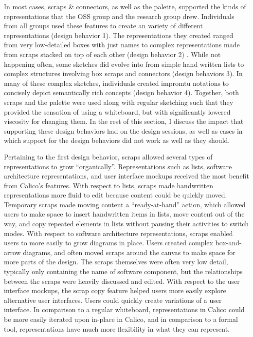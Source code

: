 In most cases, scraps \& connectors, as well as the palette, supported the kinds of representations that the OSS group and the research group drew. Individuals from all groups used these features to create an variety of different representations (design behavior 1). The representations they created ranged from very low-detailed boxes with just names to complex representations made from scraps stacked on top of each other (design behavior 2) . While not happening often, some sketches did evolve into from simple hand written lists to complex structures involving box scraps and connectors (design behaviors 3). In many of these complex sketches, individuals created impromtu notations to concisely depict semantically rich concepts (design behavior 4). Together, both scraps and the palette were used along with regular sketching such that they provided the sensation of using a whiteboard, but with significantly lowered viscosity for changing them. In the rest of this section, I discuss the impact that supporting these design behaviors had on the design sessions, as well as cases in which support for the design behaviors did not work as well as they should. 

Pertaining to the first design behavior, scraps allowed several types of representations to grow ``organically''. Representations such as lists, software architecture representations, and user interface mockups received the most benefit from Calico's features. With respect to lists, scraps made handwritten representations more fluid to edit because content could be quickly moved. Temporary scraps made moving content a ``ready-at-hand'' action, which allowed users to make space to insert handwritten items in lists, move content out of the way, and copy repeated elements in lists without pausing their activities to switch modes. With respect to software architecture representations, scraps enabled users to more easily to grow diagrams in place. Users created complex box-and-arrow diagrams, and often moved scraps around the canvas to make space for more parts of the design. The scraps themselves were often very low detail, typically only containing the name of software component, but the relationships between the scraps were heavily discussed and edited. With respect to the user interface mockups, the scrap copy feature helped users more easily explore alternative user interfaces. Users could quickly create variations of a user interface. In comparison to a regular whiteboard, representations in Calico could be more easily iterated upon in-place in Calico, and in comparison to a formal tool, representations have much more flexibility in what they can represent.

